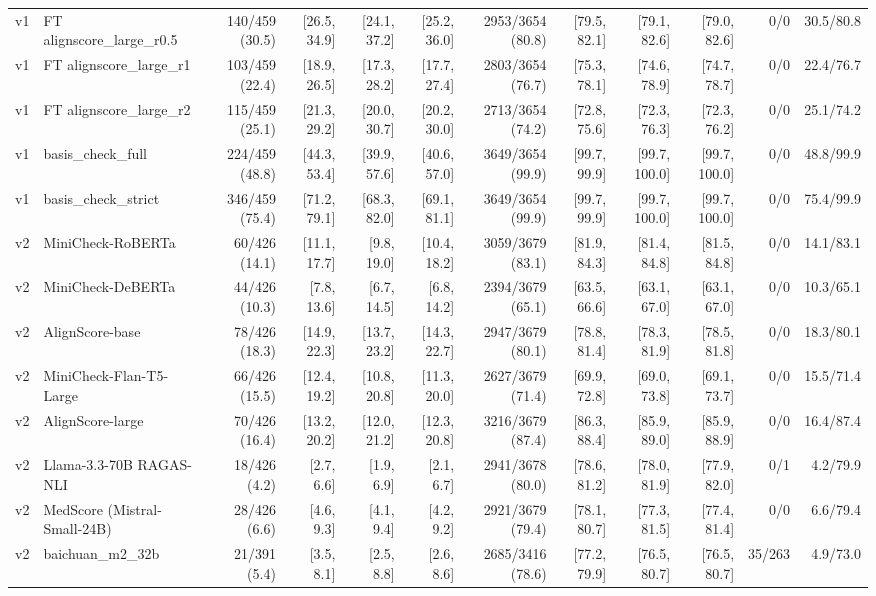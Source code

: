 \begin{table}[t]
{\begin{tabular}{llrrrrrrrrrr}
v1 & FT alignscore\_large\_r0.5 & 140/459 (30.5) & [26.5, 34.9] & [24.1, 37.2] & [25.2, 36.0] & 2953/3654 (80.8) & [79.5, 82.1] & [79.1, 82.6] & [79.0, 82.6] & 0/0 & 30.5/80.8 \\
v1 & FT alignscore\_large\_r1 & 103/459 (22.4) & [18.9, 26.5] & [17.3, 28.2] & [17.7, 27.4] & 2803/3654 (76.7) & [75.3, 78.1] & [74.6, 78.9] & [74.7, 78.7] & 0/0 & 22.4/76.7 \\
v1 & FT alignscore\_large\_r2 & 115/459 (25.1) & [21.3, 29.2] & [20.0, 30.7] & [20.2, 30.0] & 2713/3654 (74.2) & [72.8, 75.6] & [72.3, 76.3] & [72.3, 76.2] & 0/0 & 25.1/74.2 \\
v1 & basis\_check\_full & 224/459 (48.8) & [44.3, 53.4] & [39.9, 57.6] & [40.6, 57.0] & 3649/3654 (99.9) & [99.7, 99.9] & [99.7, 100.0] & [99.7, 100.0] & 0/0 & 48.8/99.9 \\
v1 & basis\_check\_strict & 346/459 (75.4) & [71.2, 79.1] & [68.3, 82.0] & [69.1, 81.1] & 3649/3654 (99.9) & [99.7, 99.9] & [99.7, 100.0] & [99.7, 100.0] & 0/0 & 75.4/99.9 \\
\midrule
v2 & MiniCheck-RoBERTa & 60/426 (14.1) & [11.1, 17.7] & [9.8, 19.0] & [10.4, 18.2] & 3059/3679 (83.1) & [81.9, 84.3] & [81.4, 84.8] & [81.5, 84.8] & 0/0 & 14.1/83.1 \\
v2 & MiniCheck-DeBERTa & 44/426 (10.3) & [7.8, 13.6] & [6.7, 14.5] & [6.8, 14.2] & 2394/3679 (65.1) & [63.5, 66.6] & [63.1, 67.0] & [63.1, 67.0] & 0/0 & 10.3/65.1 \\
v2 & AlignScore-base & 78/426 (18.3) & [14.9, 22.3] & [13.7, 23.2] & [14.3, 22.7] & 2947/3679 (80.1) & [78.8, 81.4] & [78.3, 81.9] & [78.5, 81.8] & 0/0 & 18.3/80.1 \\
v2 & MiniCheck-Flan-T5-Large & 66/426 (15.5) & [12.4, 19.2] & [10.8, 20.8] & [11.3, 20.0] & 2627/3679 (71.4) & [69.9, 72.8] & [69.0, 73.8] & [69.1, 73.7] & 0/0 & 15.5/71.4 \\
v2 & AlignScore-large & 70/426 (16.4) & [13.2, 20.2] & [12.0, 21.2] & [12.3, 20.8] & 3216/3679 (87.4) & [86.3, 88.4] & [85.9, 89.0] & [85.9, 88.9] & 0/0 & 16.4/87.4 \\
v2 & Llama-3.3-70B RAGAS-NLI & 18/426 (4.2) & [2.7, 6.6] & [1.9, 6.9] & [2.1, 6.7] & 2941/3678 (80.0) & [78.6, 81.2] & [78.0, 81.9] & [77.9, 82.0] & 0/1 & 4.2/79.9 \\
v2 & MedScore (Mistral-Small-24B) & 28/426 (6.6) & [4.6, 9.3] & [4.1, 9.4] & [4.2, 9.2] & 2921/3679 (79.4) & [78.1, 80.7] & [77.3, 81.5] & [77.4, 81.4] & 0/0 & 6.6/79.4 \\
v2 & baichuan\_m2\_32b & 21/391 (5.4) & [3.5, 8.1] & [2.5, 8.8] & [2.6, 8.6] & 2685/3416 (78.6) & [77.2, 79.9] & [76.5, 80.7] & [76.5, 80.7] & 35/263 & 4.9/73.0 \\

\end{tabular}}
\end{table}
